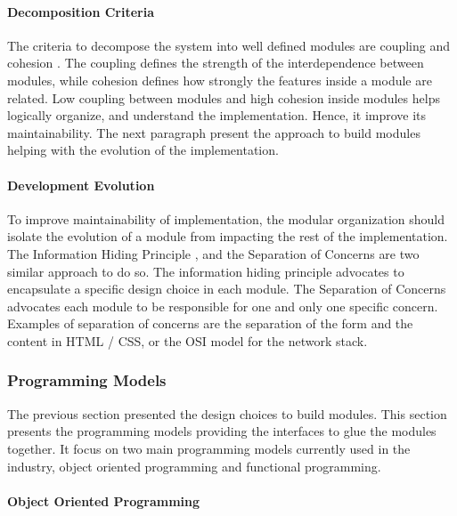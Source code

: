 
\paragraph{Decomposition Criteria}

The criteria to decompose the system into well defined modules are coupling and cohesion \cite{Stevens1974}.
The coupling defines the strength of the interdependence between modules, while cohesion defines how strongly the features inside a module are related.
Low coupling between modules and high cohesion inside modules helps logically organize, and understand the implementation.
Hence, it improve its maintainability.
The next paragraph present the approach to build modules helping with the evolution of the implementation.

\paragraph{Development Evolution}

To improve maintainability of implementation, the modular organization should isolate the evolution of a module from impacting the rest of the implementation.
The Information Hiding Principle \cite{Parnas1972}, and the Separation of Concerns \cite{Tarr1999,Hursch1995} are two similar approach to do so.
The information hiding principle advocates to encapsulate a specific design choice in each module.
The Separation of Concerns advocates each module to be responsible for one and only one specific concern.
Examples of separation of concerns are the separation of the form and the content in HTML / CSS, or the OSI model for the network stack.

\subsubsection{Programming Models} \label{chapter3:software-maintainability:programming-models}

The previous section presented the design choices to build modules.
This section presents the programming models providing the interfaces to glue the modules together.
It focus on two main programming models currently used in the industry, object oriented programming and functional programming.

\paragraph{Object Oriented Programming}


